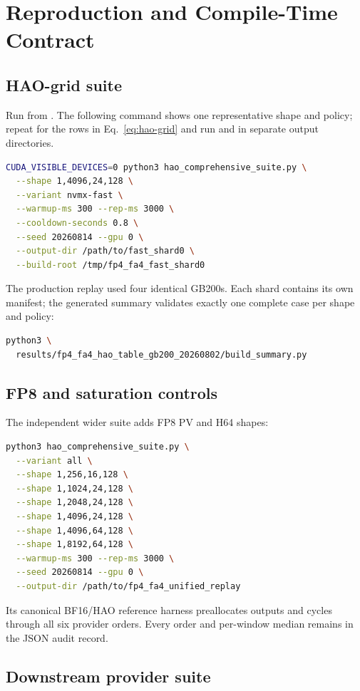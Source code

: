 \section{Reproduction and Compile-Time Contract}
\label{app:reproduction}

\subsection{HAO-grid suite}

Run from . The following command shows one
representative shape and policy; repeat  for the rows in
Eq.~\ref{eq:hao-grid} and run  and
 in separate output directories.
\begin{lstlisting}[language=bash]
CUDA_VISIBLE_DEVICES=0 python3 hao_comprehensive_suite.py \
  --shape 1,4096,24,128 \
  --variant nvmx-fast \
  --warmup-ms 300 --rep-ms 3000 \
  --cooldown-seconds 0.8 \
  --seed 20260814 --gpu 0 \
  --output-dir /path/to/fast_shard0 \
  --build-root /tmp/fp4_fa4_fast_shard0
\end{lstlisting}
The production replay used four identical GB200s. Each shard contains its
own manifest; the generated summary validates exactly one complete case per
shape and policy:
\begin{lstlisting}[language=bash]
python3 \
  results/fp4_fa4_hao_table_gb200_20260802/build_summary.py
\end{lstlisting}

\subsection{FP8 and saturation controls}

The independent wider suite adds FP8 PV and H64 shapes:
\begin{lstlisting}[language=bash]
python3 hao_comprehensive_suite.py \
  --variant all \
  --shape 1,256,16,128 \
  --shape 1,1024,24,128 \
  --shape 1,2048,24,128 \
  --shape 1,4096,24,128 \
  --shape 1,4096,64,128 \
  --shape 1,8192,64,128 \
  --warmup-ms 300 --rep-ms 3000 \
  --seed 20260814 --gpu 0 \
  --output-dir /path/to/fp4_fa4_unified_replay
\end{lstlisting}
Its canonical BF16/HAO reference harness preallocates outputs and cycles
through all six provider orders. Every order and per-window median remains
in the JSON audit record.

\subsection{Downstream provider suite}

